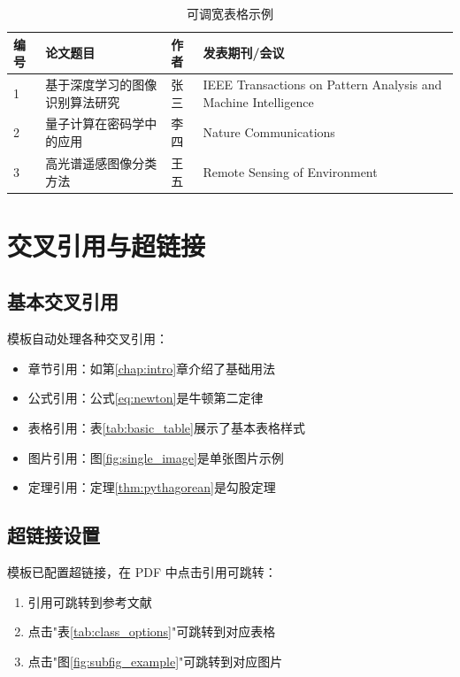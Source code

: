\begin{table}[htbp]
  \centering
  \caption{可调宽表格示例}
  \label{tab:adjustable_table}
  \begin{tabularx}{0.9\linewidth}{|l|X|l|X|}
    \hline
    \textbf{编号} & \textbf{论文题目} & \textbf{作者} & \textbf{发表期刊/会议} \\
    \hline
    1 & 基于深度学习的图像识别算法研究 & 张三 & IEEE Transactions on Pattern Analysis and Machine Intelligence \\
    \hline
    2 & 量子计算在密码学中的应用 & 李四 & Nature Communications \\
    \hline
    3 & 高光谱遥感图像分类方法 & 王五 & Remote Sensing of Environment \\
    \hline
  \end{tabularx}
\end{table}

\section{交叉引用与超链接}
\label{sec:cross_ref}

\subsection{基本交叉引用}
模板自动处理各种交叉引用：

\begin{itemize}
  \item 章节引用：如第\ref{chap:intro}章介绍了基础用法
  \item 公式引用：公式\eqref{eq:newton}是牛顿第二定律
  \item 表格引用：表\ref{tab:basic_table}展示了基本表格样式
  \item 图片引用：图\ref{fig:single_image}是单张图片示例
  \item 定理引用：定理\ref{thm:pythagorean}是勾股定理
\end{itemize}

\subsection{超链接设置}
模板已配置超链接，在 PDF 中点击引用可跳转：

\begin{enumerate}
  \item 引用\cite{Black2001}可跳转到参考文献
  \item 点击"表\ref{tab:class_options}"可跳转到对应表格
  \item 点击"图\ref{fig:subfig_example}"可跳转到对应图片
\end{enumerate}

